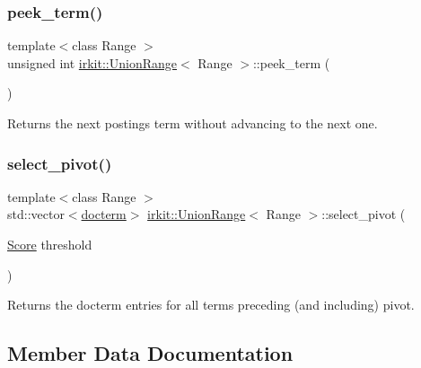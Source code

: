 \subsubsection{\texorpdfstring{peek\+\_\+term()}{peek\_term()}}
{\footnotesize\ttfamily template$<$class Range $>$ \\
unsigned int \hyperlink{classirkit_1_1UnionRange}{irkit\+::\+Union\+Range}$<$ Range $>$\+::peek\+\_\+term (\begin{DoxyParamCaption}{ }\end{DoxyParamCaption})\hspace{0.3cm}{\ttfamily [inline]}}



Returns the next posting\textquotesingle{}s term without advancing to the next one. 

\mbox{\label{classirkit_1_1UnionRange_aacb1050fb1d624260c4013f4ba1939a6}} 
\subsubsection{\texorpdfstring{select\+\_\+pivot()}{select\_pivot()}}
{\footnotesize\ttfamily template$<$class Range $>$ \\
std\+::vector$<$\hyperlink{structirkit_1_1UnionRange_1_1docterm}{docterm}$>$ \hyperlink{classirkit_1_1UnionRange}{irkit\+::\+Union\+Range}$<$ Range $>$\+::select\+\_\+pivot (\begin{DoxyParamCaption}\item[{\hyperlink{classirkit_1_1UnionRange_a47fb098a85581f5e33f4203e16245dae}{Score}}]{threshold }\end{DoxyParamCaption})\hspace{0.3cm}{\ttfamily [inline]}}

Returns the docterm entries for all terms preceding (and including) pivot. 

\subsection{Member Data Documentation}
\mbox{\label{classirkit_1_1UnionRange_a613eebb9b7b8601bffdad1d842c8c7f0}} 
